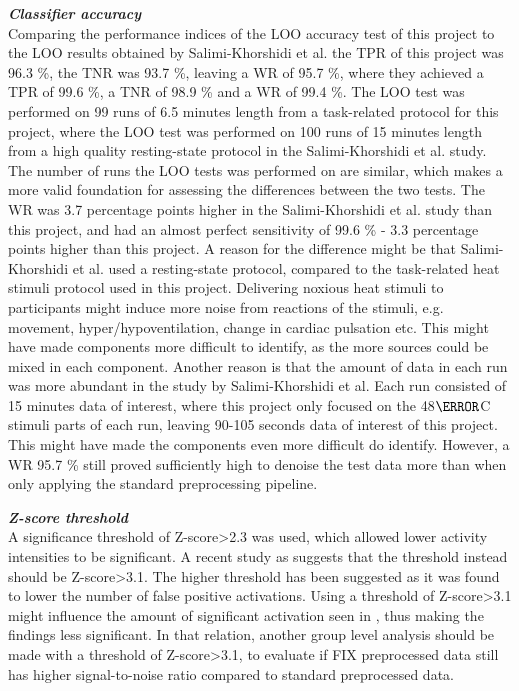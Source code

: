 \textit{\textbf{Classifier accuracy}}\\
Comparing the performance indices of the LOO accuracy test of this project to the LOO results obtained by Salimi-Khorshidi et al. \cite{Salimi-Khorshidi2014} the TPR of this project was 96.3 \%, the TNR was 93.7 \%, leaving a  WR of 95.7 \%, where they achieved a TPR of 99.6 \%, a TNR of 98.9 \% and a WR of 99.4 \%. The LOO test was performed on 99 runs of 6.5 minutes length from a task-related protocol for this project, where the LOO test was performed on 100 runs of 15 minutes length from a high quality resting-state protocol in the Salimi-Khorshidi et al. study. The number of runs the LOO tests was performed on are similar, which makes a more valid foundation for assessing the differences between the two tests. 
The WR was 3.7 percentage points higher in the Salimi-Khorshidi et al. study than this project, and had an almost perfect sensitivity of 99.6 \% - 3.3 percentage points higher than this project. A reason for the difference might be that Salimi-Khorshidi et al. used a resting-state protocol, compared to the task-related heat stimuli protocol used in this project. Delivering noxious heat stimuli to participants might induce more noise from reactions of the stimuli, e.g. movement, hyper/hypoventilation, change in cardiac pulsation etc. This might have made components more difficult to identify, as the more sources could be mixed in each component. Another reason is that the amount of data in each run was more abundant in the study by Salimi-Khorshidi et al. Each run consisted of 15 minutes data of interest, where this project only focused on the 48$\degree$C stimuli parts of each run, leaving 90-105 seconds data of interest of this project. This might have made the components even more difficult do identify. However, a WR 95.7 \% still proved sufficiently high to denoise the test data more than when only applying the standard preprocessing pipeline.

\textit{\textbf{Z-score threshold}}\\
A significance threshold of Z-score>2.3 was used, which allowed lower activity intensities to be significant. A recent study as \cite{Woo2014} suggests that the threshold instead should be Z-score>3.1. The higher threshold has been suggested as it was found to lower the number of false positive activations. Using a threshold of Z-score>3.1 might influence the amount of significant activation seen in , thus making the findings less significant. In that relation, another group level analysis should be made with a threshold of Z-score>3.1, to evaluate if FIX preprocessed data still has higher signal-to-noise ratio compared to standard preprocessed data.

